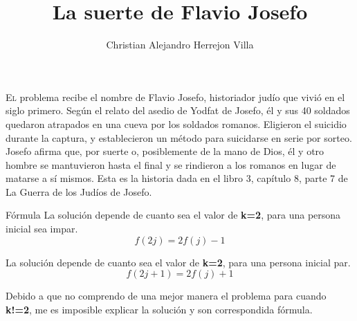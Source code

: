 \documentclass{article}
\title{La suerte de Flavio Josefo}
\author{Christian Alejandro Herrejon Villa}
\begin{document}
	\maketitle
	\lettrine{E}l problema recibe el nombre de Flavio Josefo, historiador judío que vivió en el siglo primero. Según el relato del asedio de Yodfat de Josefo, él y sus 40 soldados quedaron atrapados en una cueva por los soldados romanos. Eligieron el suicidio durante la captura, y establecieron un método para suicidarse en serie por sorteo. Josefo afirma que, por suerte o, posiblemente de la mano de Dios, él y otro hombre se mantuvieron hasta el final y se rindieron a los romanos en lugar de matarse a sí mismos. Esta es la historia dada en el libro 3, capítulo 8, parte 7 de La Guerra de los Judíos de Josefo.\\
	\newline\maketitle Fórmula
	\newline La solución depende de cuanto sea el valor de \textbf{k=2}, para una persona inicial sea impar.\\
	\begin{equation}
		f(2j)=2f(j)-1
	\end{equation}
	
La solución depende de cuanto sea el valor de \textbf{k=2}, para una persona inicial par.\\	
\begin{equation}
		f(2j+1)=2f(j)+1
	\end{equation}
	
	Debido a que no comprendo de una mejor manera el problema para cuando \textbf{k!=2}, me es imposible explicar la solución y son correspondida fórmula.
	
\end{document}
